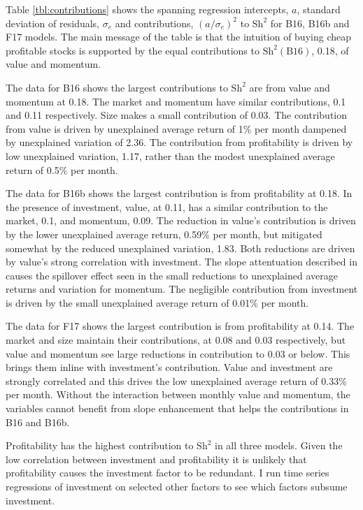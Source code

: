 
Table \ref{tbl:contributions} shows the spanning regression intercepts,
$a$, standard deviation of residuals, $\sigma_e$ and contributions,
$(a/\sigma_e)^2$ to $\text{Sh}^2$ for B16, B16b and F17 models.
The main message of the table is that the intuition of buying cheap profitable
stocks is supported by the equal contributions to $\text{Sh}^2(\text{B16})$,
0.18, of value and momentum.

The data for B16 shows the largest contributions to $\text{Sh}^2$ are from
value and momentum at 0.18.
The market and momentum have similar contributions, 0.1 and 0.11 respectively.
Size makes a small contribution of 0.03.
The contribution from value is driven by unexplained average return of 1\% per
month dampened by unexplained variation of 2.36.
The contribution from profitability is driven by low unexplained variation,
1.17, rather than the modest unexplained average return of 0.5\% per month.

The data for B16b shows the largest contribution is from profitability at 0.18.
In the presence of investment, value, at 0.11, has a similar contribution to
the market, 0.1, and momentum, 0.09.
The reduction in value's contribution is driven by the lower unexplained
average return, 0.59\% per month, but mitigated somewhat by the reduced
unexplained variation, 1.83.
Both reductions are driven by value's strong correlation with investment.
The slope attentuation described in \textcite{fama2015incremental} causes the
spillover effect seen in the small reductions to unexplained average returns
and variation for momentum.
The negligible contribution from investment is driven by the small unexplained
average return of 0.01\% per month.

The data for F17 shows the largest contribution is from profitability at 0.14.
The market and size maintain their contributions, at 0.08 and 0.03
respectively, but value and momentum see large reductions in contribution to
0.03 or below.
This brings them inline with investment's contribution.
Value and investment are strongly correlated and this drives the low
unexplained average return of 0.33\% per month.
Without the interaction between monthly value and momentum, the variables
cannot benefit from slope enhancement that helps the contributions in B16 and
B16b.

Profitability has the highest contribution to $\text{Sh}^2$ in all three
models.
Given the low correlation between investment and profitability it is unlikely
that profitability causes the investment factor to be redundant.
I run time series regressions of investment on selected other factors to see
which factors subsume investment.

